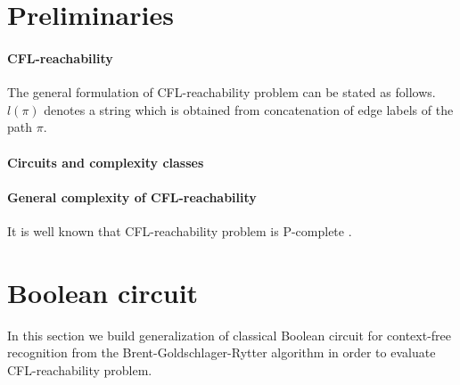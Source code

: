 \section{Preliminaries}
\label{sec:prel}
\label{preliminaries}
\paragraph{CFL-reachability} 
The general formulation of CFL-reachability problem can be stated as follows.
\\$l(\pi)$ denotes a string which is obtained from concatenation of edge labels of the path $\pi$.
\paragraph{Circuits and complexity classes} 
\paragraph{General complexity of CFL-reachability} It is well known that CFL-reachability problem is P-complete \cite{Yannakakis}. 
\section{Boolean circuit}
\label{sec:circuit}
In this section we build generalization of classical Boolean circuit for context-free recognition from the Brent-Goldschlager-Rytter algorithm \cite*{Brent, Rytter} in order to evaluate CFL-reachability problem.

